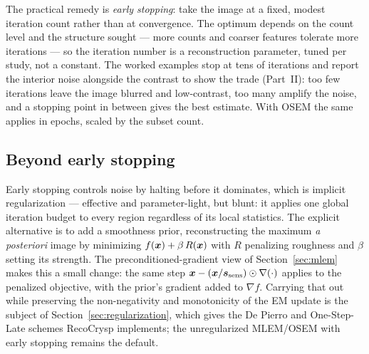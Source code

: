 The practical remedy is \emph{early stopping}: take the image at a fixed, modest
iteration count rather than at convergence. The optimum depends on the count
level and the structure sought --- more counts and coarser features tolerate more
iterations --- so the iteration number is a reconstruction parameter, tuned per
study, not a constant. The worked examples stop at tens of iterations and report
the interior noise alongside the contrast to show the trade (Part~II): too few
iterations leave the image blurred and low-contrast, too many amplify the noise,
and a stopping point in between gives the best estimate. With OSEM the same
applies in epochs, scaled by the subset count.

\subsection{Beyond early stopping}
\label{sec:acceleration:reg}

Early stopping controls noise by halting before it dominates, which is implicit
regularization --- effective and parameter-light, but blunt: it applies one
global iteration budget to every region regardless of its local statistics. The
explicit alternative is to add a smoothness prior, reconstructing the maximum
\emph{a posteriori} image by minimizing $f(\bm{x})+\beta\,R(\bm{x})$ with $R$ penalizing
roughness and $\beta$ setting its strength. The preconditioned-gradient view of
Section~\ref{sec:mlem} makes this a small change: the same step
$\bm{x}-(\bm{x}/\bm{s}_{\mathrm{sens}})\odot\nabla(\cdot)$ applies to the penalized objective, with the
prior's gradient added to $\nabla f$. Carrying that out while preserving the
non-negativity and monotonicity of the EM update is the subject of
Section~\ref{sec:regularization}, which gives the De Pierro and One-Step-Late
schemes RecoCrysp implements; the unregularized MLEM/OSEM with early stopping
remains the default.
